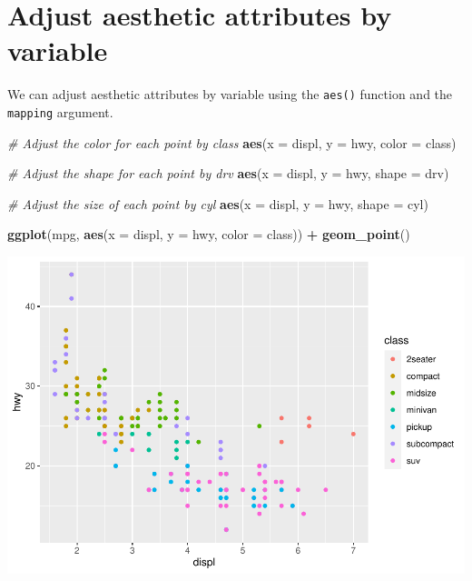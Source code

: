 \documentclass[
]{book}
\newenvironment{Shaded}{\begin{snugshade}}{\end{snugshade}}
\newcommand{\CommentTok}[1]{\textcolor[rgb]{0.56,0.35,0.01}{\textit{#1}}}
\newcommand{\DataTypeTok}[1]{\textcolor[rgb]{0.13,0.29,0.53}{#1}}
\newcommand{\KeywordTok}[1]{\textcolor[rgb]{0.13,0.29,0.53}{\textbf{#1}}}
\newcommand{\NormalTok}[1]{#1}
\newcommand{\OperatorTok}[1]{\textcolor[rgb]{0.81,0.36,0.00}{\textbf{#1}}}
\newcommand{\StringTok}[1]{\textcolor[rgb]{0.31,0.60,0.02}{#1}}
\begin{document}
\hypertarget{adjust-aesthetic-attributes-by-variable}{%
\section{Adjust aesthetic attributes by variable}\label{adjust-aesthetic-attributes-by-variable}}

We can adjust aesthetic attributes by variable using the \texttt{aes()} function and the \texttt{mapping} argument.

\begin{Shaded}
\begin{Highlighting}[]
\CommentTok{# Adjust the color for each point by class}
\KeywordTok{aes}\NormalTok{(}\DataTypeTok{x =}\NormalTok{ displ, }\DataTypeTok{y =}\NormalTok{ hwy, }\DataTypeTok{color =}\NormalTok{ class)}

\CommentTok{# Adjust the shape for each point by drv}
\KeywordTok{aes}\NormalTok{(}\DataTypeTok{x =}\NormalTok{ displ, }\DataTypeTok{y =}\NormalTok{ hwy, }\DataTypeTok{shape =}\NormalTok{ drv)}

\CommentTok{# Adjust the size of each point by cyl}
\KeywordTok{aes}\NormalTok{(}\DataTypeTok{x =}\NormalTok{ displ, }\DataTypeTok{y =}\NormalTok{ hwy, }\DataTypeTok{shape =}\NormalTok{ cyl)}
\end{Highlighting}
\end{Shaded}

\begin{Shaded}
\begin{Highlighting}[]
\KeywordTok{ggplot}\NormalTok{(mpg, }\KeywordTok{aes}\NormalTok{(}\DataTypeTok{x =}\NormalTok{ displ, }\DataTypeTok{y =}\NormalTok{ hwy, }\DataTypeTok{color =}\NormalTok{ class)) }\OperatorTok{+}\StringTok{ }\KeywordTok{geom_point}\NormalTok{()}
\end{Highlighting}
\end{Shaded}

\includegraphics{_main_files/figure-latex/unnamed-chunk-316-1.pdf}
\end{document}
